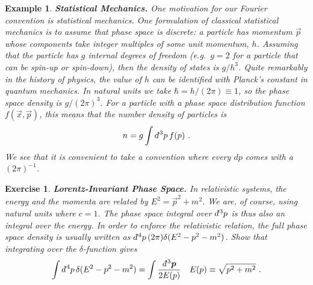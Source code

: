 \documentclass[
  11pt,
	colorful,
	raggedright,
]{tufte-style-thesis-flip}
\newtheorem{exercise}{Exercise}[section]
\newtheorem{example}{Example}[section]
\renewcommand{\dbar}{d\mkern-6mu\mathchar'26\hspace{-.1em}}    %
\begin{document}
\begin{example}
\textbf{Statistical Mechanics.} One motivation for our Fourier convention is statistical mechanics. One formulation of classical statistical mechanics is to assume that phase space is discrete: a particle has momentum $\vec{p}$ whose components take integer multiples of some unit momentum, $h$. Assuming that the particle has $g$ internal degrees of freedom (e.g.~$g=2$ for a particle that can be spin-up or spin-down), then the density of states is $g/h^{3}$. Quite remarkably in the history of physics, the value of $h$ can be identified with Planck's constant in quantum mechanics. In natural units we take $\hbar = h/(2\pi)\equiv 1$, so the phase space density is $g/(2\pi)^3$. For a particle with a phase space distribution function $f(\vec{x},\vec{p})$, this means that the number density of particles is
\begin{align}
  n = g\int \dbar^3p \, f(p) \ .
\end{align}
We see that it is convenient to take a convention where every $dp$ comes with a $(2\pi)^{-1}$.
\end{example}

\begin{exercise}\textbf{Lorentz-Invariant Phase Space.}
In relativistic systems, the energy and the momenta are related by $E^2 = \vec{p}^2 + m^2$. We are, of course, using natural units where $c=1$. The phase space integral over $\dbar^3p$ is thus also an integral over the energy. In order to enforce the relativistic relation, the full phase space density is usually written as $\dbar^4p\, (2\pi)\delta(E^2-p^2-m^2)$. Show that integrating over the $\delta$-function gives
\begin{align}
  \int \dbar^4p\, \delta(E^2-p^2-m^2) &= 
  \int \frac{\dbar^3\vec{p}}{2E(p)}
  &
  E(p) \equiv \sqrt{p^2 + m^2} \ .
\end{align}
\end{exercise}


\cite{BringhurstEoTS} \cite{segrave2009tipping}








\backmatter





\printbibliography
\cleardoublepage
\begin{wide}
\thispagestyle{empty}
\printindex
\end{wide}
\end{document}
